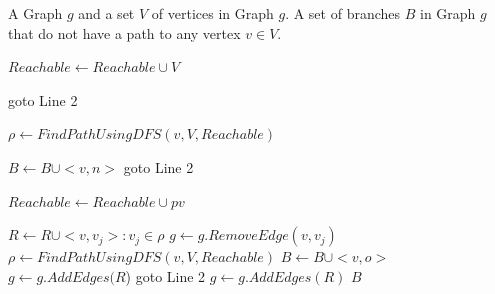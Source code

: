\newcommand{\UnrechableBranches}{\ensuremath{\mbox{\sc FindUnreachableBranches}}}
\begin{algorithm}[h!]
\begin{tiny}
\caption{$FindUnreachableBranches(g, V)$}\label{alg:irrelavantBranches}
\begin{algorithmic}[1]
\REQUIRE A Graph $g$ and a set $V$ of vertices in Graph $g$.
\ENSURE A set of branches $B$ in Graph $g$ that do not have a path to any vertex $v \in V$.

\medskip

\STATE $Reachable \leftarrow Reachable \cup V$
  
  	\STATE goto Line 2
  \ENDIF
  
	\STATE $\rho \leftarrow FindPathUsingDFS(v, V, Reachable)$
	
			\STATE $B \leftarrow B \cup <v,n>$
		\ENDFOR
   	\STATE goto Line 2
	\ENDIF
		
		\STATE $Reachable \leftarrow Reachable \cup pv$
	\ENDFOR
	
	    \STATE $R \leftarrow R \cup <v, v_j>: v_j \in \rho$
			\STATE $g \leftarrow g.RemoveEdge(v, v_j)$
			\STATE $\rho \leftarrow FindPathUsingDFS(v, V, Reachable)$
						\STATE $B \leftarrow B \cup <v,o>$
					\ENDFOR
					\STATE $g \leftarrow g.AddEdges(R$)
					\STATE goto Line 2
			\ENDIF	
	\ENDWHILE
	\STATE $g \leftarrow g.AddEdges(R)$	
\ENDFOR
\RETURN $B$
\label{alg:ICFG}
\end{algorithmic}
\end{tiny}
\end{algorithm}


